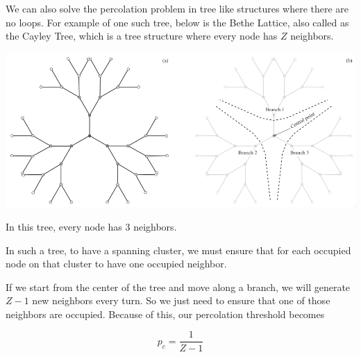 \documentclass[compress]{beamer}
\newcommand{\imp}[1]{\textcolor{NordRed}{#1}}
\begin{document}
\begin{frame}
    We can also solve the percolation problem in tree like structures where there are no
    loops. For example of one such tree, below is the \imp{Bethe Lattice}, also called as
    the \imp{Cayley Tree}, which is a tree structure where every node has \(Z\) neighbors.


    \begin{center}
        \includegraphics[width=.8\linewidth]{bethe.png}
    \end{center}

    In this tree, every node has \(3\) neighbors.
\end{frame}

\begin{frame}
    In such a tree, to have a spanning cluster, we must ensure that for each occupied node
    on that cluster to have one occupied neighbor. 

    \vspace{1em}

    If we start from the center of the tree and move along a branch, we will generate
    \(Z-1\) new neighbors every turn. So we just need to ensure that one of those
    neighbors are occupied. Because of this, our percolation threshold becomes

    \[p_c=\frac{1}{Z-1}\] 
\end{frame}
\end{document}
